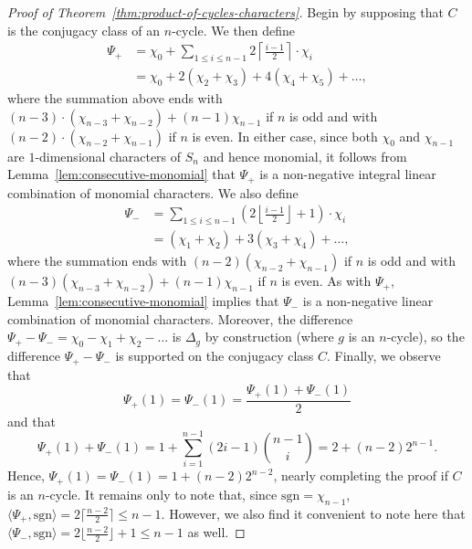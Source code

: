 \documentclass[12pt]{amsart}
\theoremstyle{definition} \newtheorem{definition}[theorem]{Definition}
\theoremstyle{example} \newtheorem{example}[theorem]{Example}
\theoremstyle{remark} \newtheorem{remark}{Remark}[theorem]
\numberwithin{equation}{section}
\numberwithin{theorem}{section}
\renewcommand{\leq}{\leqslant}
\begin{document}
	\begin{proof} [Proof of Theorem~\ref{thm:product-of-cycles-characters}]
		Begin by supposing that $C$ is the conjugacy class of an $n$-cycle.  We then define
			\begin{align*}
				\Psi_+ 
					&= \chi_0 + \sum_{1 \leq i \leq n-1} 2\left\lceil{ \frac{i-1}{2}}\right\rceil \cdot \chi_i \\
					&= \chi_0 + 2(\chi_2 + \chi_3) + 4 (\chi_4 + \chi_5) + \dots,
			\end{align*}
		where the summation above ends with $(n-3)\cdot(\chi_{n-3} + \chi_{n-2}) + (n-1)\chi_{n-1}$ if $n$ is odd and with $(n-2) \cdot (\chi_{n-2} + \chi_{n-1})$ if $n$ is even.  In either case, since both $\chi_0$ and $\chi_{n-1}$ are $1$-dimensional characters of $S_n$ and hence monomial, it follows from Lemma~\ref{lem:consecutive-monomial} that $\Psi_+$ is a non-negative integral linear combination of monomial characters.  We also define
			\begin{align*}
				\Psi_- 
					&= \sum_{1 \leq i \leq n-1} \left(2 \left\lfloor \frac{i-1}{2}\right\rfloor + 1 \right) \cdot \chi_i \\
					&= (\chi_1 + \chi_2) + 3(\chi_3+\chi_4) + \dots,
			\end{align*}
		where the summation ends with $(n-2)(\chi_{n-2}+\chi_{n-1})$ if $n$ is odd and with $(n-3)(\chi_{n-3}+\chi_{n-2}) + (n-1) \chi_{n-1}$ if $n$ is even.  As with $\Psi_+$, Lemma~\ref{lem:consecutive-monomial} implies that $\Psi_-$ is a non-negative linear combination of monomial characters.  Moreover, the difference $\Psi_+ - \Psi_- = \chi_0 - \chi_1 + \chi_2 - \dots$ is $\Delta_g$ by construction (where $g$ is an $n$-cycle), so the difference $\Psi_+ - \Psi_-$ is supported on the conjugacy class $C$.  Finally, we observe that
			\[
				\Psi_+(1) = \Psi_-(1) = \frac{\Psi_+(1)+\Psi_-(1)}{2}
			\]
		and that
			\[
				 \Psi_+(1)+\Psi_-(1)
					= 1 + \sum_{i=1}^{n-1} (2i-1) \binom{n-1}{i}
					= 2 + (n-2)2^{n-1}.
			\]
		Hence, $\Psi_+(1) = \Psi_-(1) = 1 + (n-2)2^{n-2}$, nearly completing the proof if $C$ is an $n$-cycle.
		It remains only to note that, since $\mathrm{sgn} = \chi_{n-1}$, $\langle \Psi_+, \mathrm{sgn} \rangle = 2\lceil \frac{n-2}{2}\rceil \leq n-1$.  However, we also find it convenient to note here that $\langle \Psi_-,\mathrm{sgn} \rangle = 2\lfloor \frac{n-2}{2}\rfloor+1 \leq n-1$ as well.
		

\end{proof}
\end{document}
